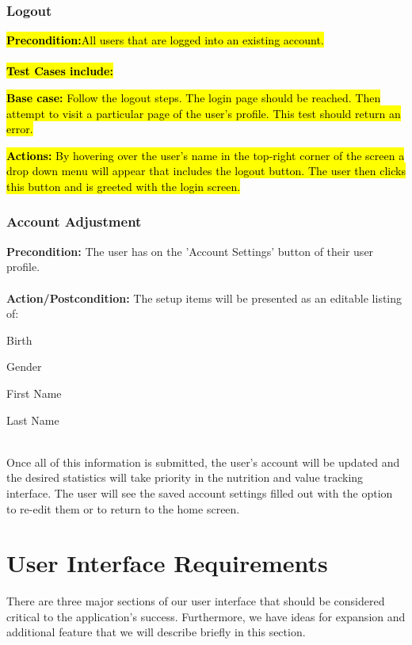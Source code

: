 \documentclass[a4paper,12pt]{article}
\begin{document}
\subsubsection{Logout}
\hl{\textbf{Precondition:}All users that are logged into an existing account.}\\
\\
\hl{\textbf{Test Cases include: }}
\begin{list}{•}{•}
\item \hl{\textbf{Base case: }Follow the logout steps. The login page should be reached. Then attempt to visit a particular page of the user's profile. This test should return an error.}
\end{list}
\hl{\textbf{Actions:} By hovering over the user's name in the top-right corner of the screen a drop down menu will appear that includes the logout button.  The user then clicks this button and is greeted with the login screen.}\\

\subsubsection{Account Adjustment}
\textbf{Precondition:} The user has on the 'Account Settings' button of their user profile.\\
\\
\textbf{Action/Postcondition:} The setup items will be presented as an editable listing of:
\begin{list}{•}{•}
\item Birth
\item Gender
\item First Name
\item Last Name
\end{list}
\\
Once all of this information is submitted, the user's account will be updated and the desired statistics will take priority in the nutrition and value tracking interface. The user will see the saved account settings filled out with the option to re-edit them or to return to the home screen.

\section{User Interface Requirements}
There are three major sections of our user interface that should be considered critical to the application's success.  Furthermore, we have ideas for expansion and additional feature that we will describe briefly in this section.
\end{document}
